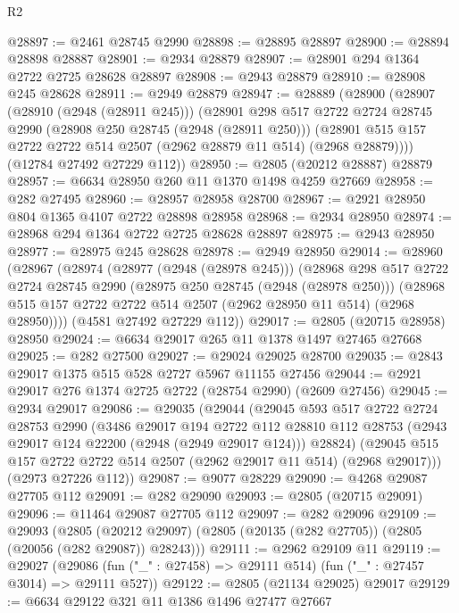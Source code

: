 \begin{lexlean}{R2}
\begin{coremodule}
@28897 := @2461 @28745 @2990
@28898 := @28895 @28897
@28900 := @28894 @28898 @28887
@28901 := @2934 @28879
@28907 := @28901 @294 @1364 @2722 @2725 @28628 @28897
@28908 := @2943 @28879
@28910 := @28908 @245 @28628
@28911 := @2949 @28879
@28947 := @28889
    (@28900
      (@28907
        (@28910 (@2948 (@28911 @245)))
        (@28901
          @298
          @517
          @2722
          @2724
          @28745
          @2990
          (@28908 @250 @28745 (@2948 (@28911 @250)))
          (@28901 @515 @157 @2722 @2722 @514 @2507 (@2962 @28879 @11 @514) (@2968 @28879))))
      (@12784 @27492 @27229 @112))
@28950 := @2805 (@20212 @28887) @28879
@28957 := @6634 @28950 @260 @11 @1370 @1498 @4259 @27669
@28958 := @282 @27495
@28960 := @28957 @28958 @28700
@28967 := @2921 @28950 @804 @1365 @4107 @2722 @28898 @28958
@28968 := @2934 @28950
@28974 := @28968 @294 @1364 @2722 @2725 @28628 @28897
@28975 := @2943 @28950
@28977 := @28975 @245 @28628
@28978 := @2949 @28950
@29014 := @28960
    (@28967
      (@28974
        (@28977 (@2948 (@28978 @245)))
        (@28968
          @298
          @517
          @2722
          @2724
          @28745
          @2990
          (@28975 @250 @28745 (@2948 (@28978 @250)))
          (@28968 @515 @157 @2722 @2722 @514 @2507 (@2962 @28950 @11 @514) (@2968 @28950))))
      (@4581 @27492 @27229 @112))
@29017 := @2805 (@20715 @28958) @28950
@29024 := @6634 @29017 @265 @11 @1378 @1497 @27465 @27668
@29025 := @282 @27500
@29027 := @29024 @29025 @28700
@29035 := @2843 @29017 @1375 @515 @528 @2727 @5967 @11155 @27456
@29044 := @2921 @29017 @276 @1374 @2725 @2722 (@28754 @2990) (@2609 @27456)
@29045 := @2934 @29017
@29086 := @29035
    (@29044
      (@29045
        @593
        @517
        @2722
        @2724
        @28753
        @2990
        (@3486
          @29017
          @194
          @2722
          @112
          @28810
          @112
          @28753
          (@2943 @29017 @124 @22200 (@2948 (@2949 @29017 @124)))
          @28824)
        (@29045 @515 @157 @2722 @2722 @514 @2507 (@2962 @29017 @11 @514) (@2968 @29017)))
      (@2973 @27226 @112))
@29087 := @9077 @28229
@29090 := @4268 @29087 @27705 @112
@29091 := @282 @29090
@29093 := @2805 (@20715 @29091)
@29096 := @11464 @29087 @27705 @112
@29097 := @282 @29096
@29109 := @29093
    (@2805 (@20212 @29097) (@2805 (@20135 (@282 @27705)) (@2805 (@20056 (@282 @29087)) @28243)))
@29111 := @2962 @29109 @11
@29119 := @29027
    (@29086 (fun ("_" : @27458) => @29111 @514) (fun ("_" : @27457 @3014) => @29111 @527))
@29122 := @2805 (@21134 @29025) @29017
@29129 := @6634 @29122 @321 @11 @1386 @1496 @27477 @27667

\end{coremodule}
\end{lexlean}
